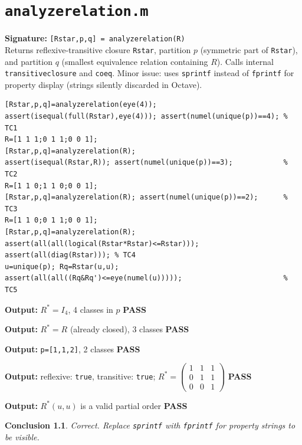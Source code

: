 \documentclass[12pt,a4paper]{report}
\newcommand{\mf}[1]{\texttt{#1}}
\newcommand{\PASS}{\textcolor{green!60!black}{\textbf{PASS}}}
\newtheorem{concl}{Conclusion}[chapter]
\begin{document}
\chapter{\mf{analyzerelation.m}}
\begin{tcolorbox}[Abox,title=Analysis]
\textbf{Signature:} \lstinline|[Rstar,p,q] = analyzerelation(R)|\\
Returns reflexive-transitive closure \mf{Rstar}, partition $p$ (symmetric part of \mf{Rstar}), and partition $q$ (smallest equivalence relation containing $R$). Calls internal \mf{transitiveclosure} and \mf{coeq}. Minor issue: uses \mf{sprintf} instead of \mf{fprintf} for property display (strings silently discarded in Octave).
\end{tcolorbox}
\begin{lstlisting}[caption={Tests for analyzerelation.m}]
[Rstar,p,q]=analyzerelation(eye(4));
assert(isequal(full(Rstar),eye(4))); assert(numel(unique(p))==4); % TC1
R=[1 1 1;0 1 1;0 0 1];
[Rstar,p,q]=analyzerelation(R);
assert(isequal(Rstar,R)); assert(numel(unique(p))==3);            % TC2
R=[1 1 0;1 1 0;0 0 1];
[Rstar,p,q]=analyzerelation(R); assert(numel(unique(p))==2);      % TC3
R=[1 1 0;0 1 1;0 0 1];
[Rstar,p,q]=analyzerelation(R);
assert(all(all(logical(Rstar*Rstar)<=Rstar))); assert(all(diag(Rstar))); % TC4
u=unique(p); Rq=Rstar(u,u);
assert(all(all((Rq&Rq')<=eye(numel(u)))));                        % TC5
\end{lstlisting}
\begin{tcolorbox}[Pbox,title=TC1 -- Identity relation]
\textbf{Output:} $R^*=I_4$, 4 classes in $p$ \quad \PASS
\end{tcolorbox}
\begin{tcolorbox}[Pbox,title=TC2 -- Total order $1\leq2\leq3$]
\textbf{Output:} $R^*=R$ (already closed), 3 classes \quad \PASS
\end{tcolorbox}
\begin{tcolorbox}[Pbox,title=TC3 -- Equivalence $\{1\sim2\}+\{3\}$]
\textbf{Output:} \texttt{p=[1,1,2]}, 2 classes \quad \PASS
\end{tcolorbox}
\begin{tcolorbox}[Pbox,title=TC4 -- Closure is reflexive and transitive]
\textbf{Output:} reflexive: \texttt{true}, transitive: \texttt{true}; $R^*=\begin{pmatrix}1&1&1\\0&1&1\\0&0&1\end{pmatrix}$ \quad \PASS
\end{tcolorbox}
\begin{tcolorbox}[Pbox,title=TC5 -- Quotient is antisymmetric]
\textbf{Output:} $R^*(u,u)$ is a valid partial order \quad \PASS
\end{tcolorbox}
\begin{concl}
Correct. Replace \mf{sprintf} with \mf{fprintf} for property strings to be visible.
\end{concl}
\end{document}
